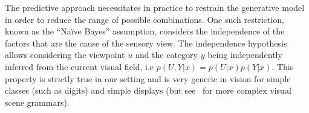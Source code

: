 The predictive approach necessitates in practice to restrain the generative model in order to reduce the range of possible combinations. One such restriction, known as the ``Naïve Bayes'' assumption, considers the independence of the factors that are the cause of the sensory view.
The independence hypothesis allows considering the viewpoint $u$ and the category $y$ being independently inferred from the current visual field, i.e $p(U,Y|x) = p(U|x) p(Y|x)$. This property is strictly true in our setting and is very generic in vision for simple classes (such as digits) and simple displays (but see~\cite{Vo12} for more complex visual scene grammars).
%


